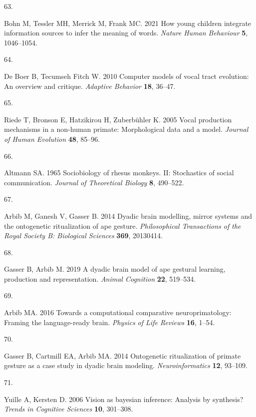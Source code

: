 \documentclass[
  man,floatsintext]{apa6}
\newlength{\cslhangindent}
\newlength{\csllabelwidth}
\newlength{\cslentryspacingunit} %
\newenvironment{CSLReferences}[2] %
 {%
  \setlength{\parindent}{0pt}
  \ifodd #1
  \let\oldpar\par
  \def\par{\hangindent=\cslhangindent\oldpar}
  \fi
  \setlength{\parskip}{#2\cslentryspacingunit}
 }%
 {}
\newcommand{\CSLLeftMargin}[1]{\parbox[t]{\csllabelwidth}{#1}}
\newcommand{\CSLRightInline}[1]{\parbox[t]{\linewidth - \csllabelwidth}{#1}\break}
\begin{document}
\begin{CSLReferences}{0}{0}
\leavevmode{}%
\CSLLeftMargin{63. }
\CSLRightInline{Bohn M, Tessler MH, Merrick M, Frank MC. 2021 How young children integrate information sources to infer the meaning of words. \emph{Nature Human Behaviour} \textbf{5}, 1046--1054.}

\leavevmode{}%
\CSLLeftMargin{64. }
\CSLRightInline{De Boer B, Tecumseh Fitch W. 2010 Computer models of vocal tract evolution: An overview and critique. \emph{Adaptive Behavior} \textbf{18}, 36--47.}

\leavevmode{}%
\CSLLeftMargin{65. }
\CSLRightInline{Riede T, Bronson E, Hatzikirou H, Zuberbühler K. 2005 Vocal production mechanisms in a non-human primate: Morphological data and a model. \emph{Journal of Human Evolution} \textbf{48}, 85--96.}

\leavevmode{}%
\CSLLeftMargin{66. }
\CSLRightInline{Altmann SA. 1965 Sociobiology of rhesus monkeys. II: Stochastics of social communication. \emph{Journal of Theoretical Biology} \textbf{8}, 490--522.}

\leavevmode{}%
\CSLLeftMargin{67. }
\CSLRightInline{Arbib M, Ganesh V, Gasser B. 2014 Dyadic brain modelling, mirror systems and the ontogenetic ritualization of ape gesture. \emph{Philosophical Transactions of the Royal Society B: Biological Sciences} \textbf{369}, 20130414.}

\leavevmode{}%
\CSLLeftMargin{68. }
\CSLRightInline{Gasser B, Arbib M. 2019 A dyadic brain model of ape gestural learning, production and representation. \emph{Animal Cognition} \textbf{22}, 519--534.}

\leavevmode{}%
\CSLLeftMargin{69. }
\CSLRightInline{Arbib MA. 2016 Towards a computational comparative neuroprimatology: Framing the language-ready brain. \emph{Physics of Life Reviews} \textbf{16}, 1--54.}

\leavevmode{}%
\CSLLeftMargin{70. }
\CSLRightInline{Gasser B, Cartmill EA, Arbib MA. 2014 Ontogenetic ritualization of primate gesture as a case study in dyadic brain modeling. \emph{Neuroinformatics} \textbf{12}, 93--109.}

\leavevmode{}%
\CSLLeftMargin{71. }
\CSLRightInline{Yuille A, Kersten D. 2006 Vision as bayesian inference: Analysis by synthesis? \emph{Trends in Cognitive Sciences} \textbf{10}, 301--308.}


\end{CSLReferences}
\end{document}
